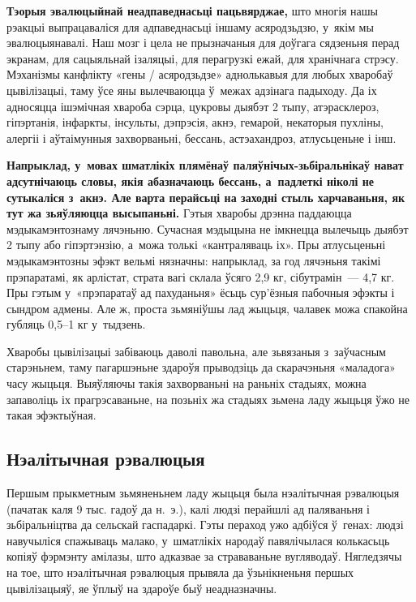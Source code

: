 \textbf{Тэорыя эвалюцыйнай неадпаведнасьці пацьвярджае,} што многія нашы рэакцыі выпрацаваліся для адпаведнасьці іншаму асяродзьдзю, у~якім мы эвалюцыянавалі. Наш мозг і цела не прызначаныя для доўгага сядзеньня перад экранам, для сацыяльнай ізаляцыі, для перагрузкі ежай, для хранічнага стрэсу. Мэханізмы канфлікту «гены / асяродзьдзе» аднолькавыя для любых хваробаў цывілізацыі, таму ўсе яны вылечваюцца ў~межах адзінага падыходу. Да іх адносяцца ішэмічная хвароба сэрца, цукровы дыябэт 2 тыпу, атэрасклероз, гіпэртанія, інфаркты, інсульты, дэпрэсія, акнэ, гемарой, некаторыя пухліны, алергіі і аўтаімунныя захворваньні, бессань, астэахандроз, атлусьценьне і інш.


\textbf{Напрыклад, у~мовах шматлікіх плямёнаў паляўнічых-зьбіральнікаў нават адсутнічаюць словы, якія абазначаюць бессань, а~падлеткі ніколі не сутыкаліся з~акнэ. Але варта перайсьці на заходні стыль харчаваньня, як тут жа зьяўляюцца высыпаньні.} Гэтыя хваробы дрэнна паддаюцца мэдыкамэнтознаму лячэньню. Сучасная мэдыцына не імкнецца вылечыць дыябэт 2 тыпу або гіпэртэнзію, а~можа толькі «кантраляваць іх». Пры атлусьценьні мэдыкамэнтозны эфэкт вельмі нязначны: напрыклад, за год лячэньня такімі прэпаратамі, як арлістат, страта вагі склала ўсяго 2,9 кг, сібутрамін~--- 4,7 кг. Пры гэтым у~«прэпаратаў ад пахуданьня» ёсьць сур'ёзныя пабочныя эфэкты і сындром адмены. Але ж, проста зьмяніўшы лад жыцьця, чалавек можа спакойна губляць 0,5--1 кг у~тыдзень.

Хваробы цывілізацыі забіваюць даволі павольна, але зьвязаныя з~заўчасным старэньнем, таму пагаршэньне здароўя прыводзіць да скарачэньня «маладога» часу жыцьця. Выяўляючы такія захворваньні на раньніх стадыях, можна запаволіць іх прагрэсаваньне, на позьніх жа стадыях зьмена ладу жыцьця ўжо не такая эфэктыўная.

\subsection*{Нэалітычная рэвалюцыя}

Першым прыкметным зьмяненьнем ладу жыцьця была нэалітычная рэвалюцыя (пачатак каля 9 тыс. гадоў да н.~э.), калі людзі перайшлі ад паляваньня і зьбіральніцтва да сельскай гаспадаркі. Гэты пераход ужо адбіўся ў~генах: людзі навучыліся спажываць малако, у~шматлікіх народаў павялічылася колькасьць копіяў фэрмэнту амілазы, што адказвае за страваваньне вугляводаў. Нягледзячы на тое, што нэалітычная рэвалюцыя прывяла да ўзьнікненьня першых цывілізацыяў, яе ўплыў на здароўе быў неадназначны.

